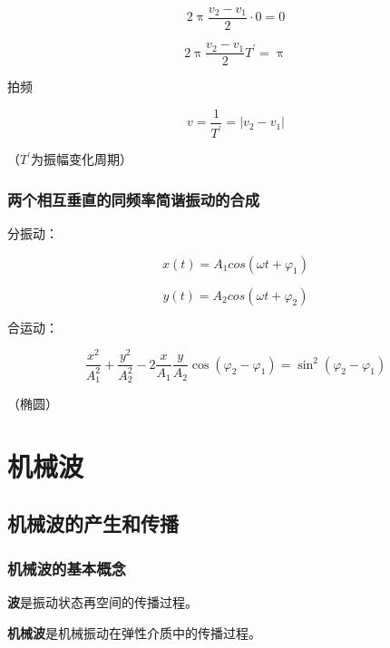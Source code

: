 \documentclass[
	12pt, %
	a4paper, %
]{myLegrandOrangeBook}
\begin{document}
    $$
        2 \uppi \frac{v_2-v_1}{2} \cdot 0=0
    $$

    $$
        2 \uppi \frac{v_2-v_1}{2}T^{\prime}=\uppi
    $$

    拍频

    \begin{equation}
        v=\frac{1}{T^{\prime}}=\left|v_2-v_1\right|
    \end{equation}

    （\(T^{\prime}\)为振幅变化周期）

\subsection{两个相互垂直的同频率简谐振动的合成}

    分振动：

    \[
        x\left(t\right) = A_1 cos\left(\omega t + \varphi_1\right)
    \]

    \[
        y\left(t\right) = A_2 cos\left(\omega t + \varphi_2\right)
    \]

    合运动：

    \begin{equation}
        \frac{x^2}{A_1^2}+\frac{y^2}{A_2^2}-2 \frac{x}{A_1} \frac{y}{A_2} \cos \left(\varphi_2-\varphi_1\right)=\sin ^2\left(\varphi_2-\varphi_1\right)
    \end{equation}

    （椭圆）

\chapterspaceabove{6.25cm} %
\chapterspacebelow{7.5cm} %

\chapter{机械波}

\section{机械波的产生和传播}

\subsection{机械波的基本概念}

    \textbf{波}是振动状态再空间的传播过程。

    \textbf{机械波}是机械振动在弹性介质中的传播过程。
\end{document}
